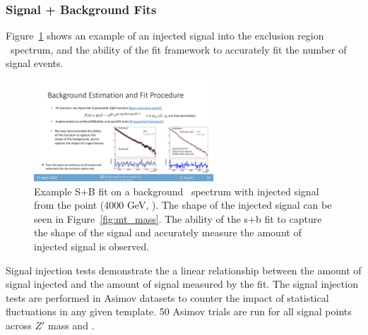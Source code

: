 \clearpage
\subsubsection{Signal + Background Fits}
\label{subsec:fit_splusb}

Figure~\ref{fig:splusb_sigInj} shows an example of an injected signal into the exclusion region \mt~spectrum, and the ability of the fit framework to accurately fit the number of signal events.
\begin{figure}[!htbp]
\centering
   \includegraphics[width=0.6\textwidth]{figures/stats/splusb_sigInj}
    \caption{Example S+B fit on a background \mt~spectrum with injected signal from the point (4000 GeV, ). The shape of the injected signal can be seen in Figure~\ref{fig:mt_mass}. The ability of the s+b fit to capture the shape of the signal and accurately measure the amount of injected signal is observed.
    \label{fig:splusb_sigInj}}
\end{figure}

Signal injection tests demonstrate the a linear relationship between the amount of signal injected and the amount of signal measured by the fit.
The signal injection tests are performed in Asimov datasets to counter the impact of statistical fluctuations in any given template.
50 Asimov trials are run for all signal points across $Z'$ mass and \rinv.


